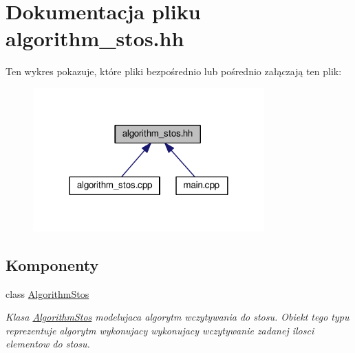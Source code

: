 \hypertarget{algorithm__stos_8hh}{\section{Dokumentacja pliku algorithm\-\_\-stos.\-hh}
\label{algorithm__stos_8hh}
}
Ten wykres pokazuje, które pliki bezpośrednio lub pośrednio załączają ten plik\-:\nopagebreak
\begin{figure}[H]
\begin{center}
\leavevmode
\includegraphics[width=252pt]{algorithm__stos_8hh__dep__incl}
\end{center}
\end{figure}
\subsection*{Komponenty}
\begin{DoxyCompactItemize}
\item 
class \hyperlink{class_algorithm_stos}{Algorithm\-Stos}
\begin{DoxyCompactList}\small\item\em Klasa \hyperlink{class_algorithm_stos}{Algorithm\-Stos} modelujaca algorytm wczytywania do stosu. Obiekt tego typu reprezentuje algorytm wykonujacy wykonujacy wczytywanie zadanej ilosci elementow do stosu. \end{DoxyCompactList}\end{DoxyCompactItemize}
